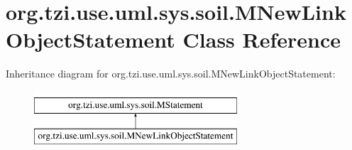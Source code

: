 \hypertarget{classorg_1_1tzi_1_1use_1_1uml_1_1sys_1_1soil_1_1_m_new_link_object_statement}{\section{org.\-tzi.\-use.\-uml.\-sys.\-soil.\-M\-New\-Link\-Object\-Statement Class Reference}
\label{classorg_1_1tzi_1_1use_1_1uml_1_1sys_1_1soil_1_1_m_new_link_object_statement}
}
Inheritance diagram for org.\-tzi.\-use.\-uml.\-sys.\-soil.\-M\-New\-Link\-Object\-Statement\-:\begin{figure}[H]
\begin{center}
\leavevmode
\includegraphics[height=2.000000cm]{classorg_1_1tzi_1_1use_1_1uml_1_1sys_1_1soil_1_1_m_new_link_object_statement}
\end{center}
\end{figure}
